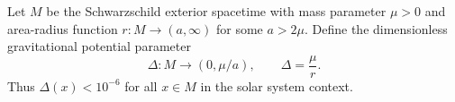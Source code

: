Let $M$ be the Schwarzschild exterior spacetime with mass parameter $\mu > 0$ and area-radius function $r: M \to (a, \infty)$ for some $a > 2\mu$. Define the dimensionless gravitational potential parameter
$$
\Delta: M \to (0, \mu/a), \qquad \Delta = \frac{\mu}{r}.
$$
Thus $\Delta(x) < 10^{-6}$ for all $x \in M$ in the solar system context.
